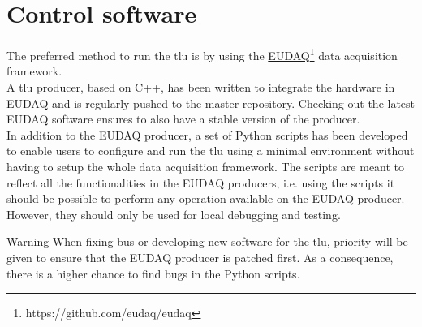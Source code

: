 \chapter{Control software}\label{ch:controlsw}
The preferred method to run the \gls{tlu} is by using the \href{https://github.com/eudaq/eudaq}{EUDAQ}\footnote{https://github.com/eudaq/eudaq} data acquisition framework.\\
A \gls{tlu} producer, based on C++, has been written to integrate the hardware in EUDAQ and is regularly pushed to the master repository. Checking out the latest EUDAQ software ensures to also have a stable version of the producer.\\
In addition to the EUDAQ producer, a set of Python scripts has been developed to enable users to configure and run the \gls{tlu} using a minimal environment without having to setup the whole data acquisition framework. The scripts are meant to reflect all the functionalities in the EUDAQ producers, i.e. using the scripts it should be possible to perform any operation available on the EUDAQ producer. However, they should only be used for local debugging and testing.\\
\begin{alertinfo}{Warning}
    When fixing bus or developing new software for the \gls{tlu}, priority will be given to ensure that the EUDAQ producer is patched first. As a consequence, there is a higher chance to find bugs in the Python scripts. 
\end{alertinfo}


